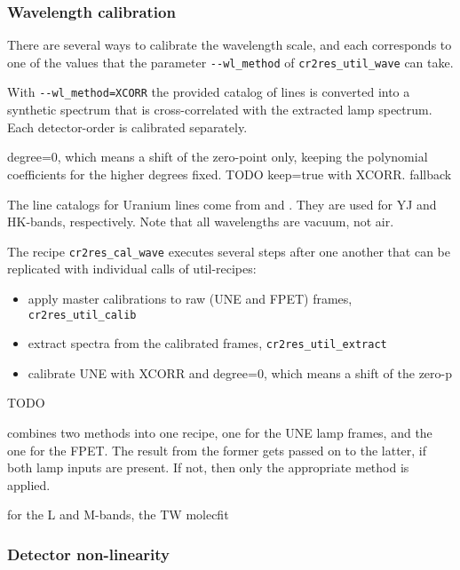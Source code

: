 \subsubsection{Wavelength calibration}


There are several ways to calibrate the wavelength scale, and each corresponds
to one of the values that the parameter \texttt{-{}-wl\_method} of
\texttt{cr2res\_util\_wave} can take.

With \texttt{-{}-wl\_method=XCORR} the provided catalog of lines is converted
into a synthetic spectrum that is cross-correlated with the extracted lamp
spectrum. Each detector-order is calibrated separately.

degree=0, which means a shift of the zero-point only, keeping the polynomial coefficients for the higher degrees fixed.
TODO
keep=true with XCORR.
fallback

The line catalogs for Uranium lines come from \cite{2018A&A...618A.118S} and
\cite{2011ApJS..195...24R}. They are used for YJ and HK-bands, respectively.
Note that all wavelengths are vacuum, not air.



The recipe \texttt{cr2res\_cal\_wave} executes several steps after one another that can be replicated with individual calls of util-recipes:

\begin{itemize}
    \item apply master calibrations to raw (UNE and FPET) frames, \verb!cr2res_util_calib!
    \item extract spectra from the calibrated frames, \verb!cr2res_util_extract!
    \item calibrate UNE with XCORR and degree=0, which means a shift of the zero-p
    
\end{itemize}

TODO

combines two methods into one recipe, one
for the UNE lamp frames, and the one for the FPET. The result from the former
gets passed on to the latter, if both lamp inputs are present. If not, then only
the appropriate method is applied. 


for the L and M-bands, the TW
molecfit

\subsubsection{Detector non-linearity}
\label{sec:detlin}

